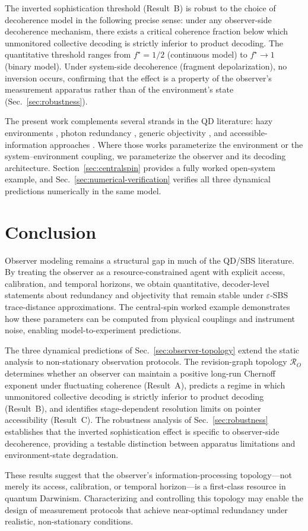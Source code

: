 \documentclass[11pt]{article}
\newcommand{\cR}{\mathcal{R}}
\newcommand{\1}{\mathbf{1}}
\theoremstyle{definition}
\theoremstyle{plain}
\begin{document}
The inverted sophistication threshold (Result~B) is robust to the choice of decoherence model in the following precise sense: under any observer-side decoherence mechanism, there exists a critical coherence fraction below which unmonitored collective decoding is strictly inferior to product decoding.  The quantitative threshold ranges from $f^\star=1/2$ (continuous model) to $f^\star\to 1$ (binary model).  Under system-side decoherence (fragment depolarization), no inversion occurs, confirming that the effect is a property of the observer's measurement apparatus rather than of the environment's state (Sec.~\ref{sec:robustness}).

The present work complements several strands in the QD literature: hazy environments \citep{ZwolakQuanZurek2009}, photon redundancy \citep{RiedelZurek2010,RiedelZurek2011}, generic objectivity \citep{BrandaoPianiHorodecki2015,Knott2018}, and accessible-information approaches \citep{Touil2022}.  Where those works parameterize the environment or the system--environment coupling, we parameterize the observer and its decoding architecture.  Section~\ref{sec:centralspin} provides a fully worked open-system example, and Sec.~\ref{sec:numerical-verification} verifies all three dynamical predictions numerically in the same model.

\section{Conclusion}

Observer modeling remains a structural gap in much of the QD/SBS literature.
By treating the observer as a resource-constrained agent with explicit access, calibration, and temporal horizons, we obtain quantitative, decoder-level statements about redundancy and objectivity that remain stable under $\varepsilon$-SBS trace-distance approximations.
The central-spin worked example demonstrates how these parameters can be computed from physical couplings and instrument noise, enabling model-to-experiment predictions.

The three dynamical predictions of Sec.~\ref{sec:observer-topology} extend the static analysis to non-stationary observation protocols.  The revision-graph topology $\cR_O$ determines whether an observer can maintain a positive long-run Chernoff exponent under fluctuating coherence (Result~A), predicts a regime in which unmonitored collective decoding is strictly inferior to product decoding (Result~B), and identifies stage-dependent resolution limits on pointer accessibility (Result~C).  The robustness analysis of Sec.~\ref{sec:robustness} establishes that the inverted sophistication effect is specific to observer-side decoherence, providing a testable distinction between apparatus limitations and environment-state degradation.

These results suggest that the observer's information-processing topology---not merely its access, calibration, or temporal horizon---is a first-class resource in quantum Darwinism.  Characterizing and controlling this topology may enable the design of measurement protocols that achieve near-optimal redundancy under realistic, non-stationary conditions.



\end{document}
